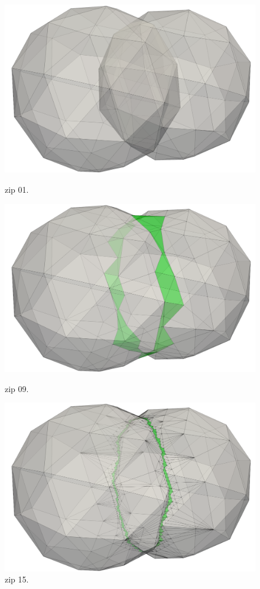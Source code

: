 \begin{figure}
  \centering
  \begin{minipage}[b]{0.32\textwidth}
    \includegraphics[width=\textwidth]{pics/pic_zip_01.png}
    \caption{zip 01.}\label{fig:pic_zip_01}
  \end{minipage}
  \hfill
  \begin{minipage}[b]{0.32\textwidth}
    \includegraphics[width=\textwidth]{pics/pic_zip_09.png}
    \caption{zip 09.}\label{fig:pic_zip_09}
  \end{minipage}
  \hfill
  \begin{minipage}[b]{0.32\textwidth}
    \includegraphics[width=\textwidth]{pics/pic_zip_15.png}
    \caption{zip 15.}\label{fig:pic_zip_15}
  \end{minipage}
\end{figure}